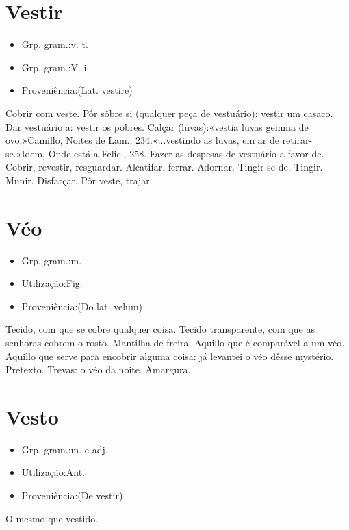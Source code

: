 \documentclass{article}
\begin{document}
\section{Vestir}
\begin{itemize}
\item {Grp. gram.:v. t.}
\end{itemize}
\begin{itemize}
\item {Grp. gram.:V. i.}
\end{itemize}
\begin{itemize}
\item {Proveniência:(Lat. \textunderscore vestire\textunderscore )}
\end{itemize}
Cobrir com veste.
Pôr sôbre si (qualquer peça de vestuário): \textunderscore vestir um casaco\textunderscore .
Dar vestuário a: \textunderscore vestir os pobres\textunderscore .
Calçar (luvas):«\textunderscore vestia luvas gemma de ovo.\textunderscore »Camillo, \textunderscore Noites de Lam.\textunderscore , 234.«\textunderscore ...vestindo as luvas, em ar de retirar-se.\textunderscore »\textunderscore Idem\textunderscore , \textunderscore Onde está a Felic.\textunderscore , 258.
Fazer as despesas de vestuário a favor de.
Cobrir, revestir, resguardar.
Alcatifar, ferrar.
Adornar.
Tingir-se de.
Tingir.
Munir.
Disfarçar.
Pôr veste, trajar.
\section{Véo}
\begin{itemize}
\item {Grp. gram.:m.}
\end{itemize}
\begin{itemize}
\item {Utilização:Fig.}
\end{itemize}
\begin{itemize}
\item {Proveniência:(Do lat. \textunderscore velum\textunderscore )}
\end{itemize}
Tecido, com que se cobre qualquer coisa.
Tecido transparente, com que as senhoras cobrem o rosto.
Mantilha de freira.
Aquillo que é comparável a um véo.
Aquillo que serve para encobrir alguma coisa: \textunderscore já levantei o véo dêsse mystério\textunderscore .
Pretexto.
Trevas: \textunderscore o véo da noite\textunderscore .
Amargura.
\section{Vesto}
\begin{itemize}
\item {Grp. gram.:m.  e  adj.}
\end{itemize}
\begin{itemize}
\item {Utilização:Ant.}
\end{itemize}
\begin{itemize}
\item {Proveniência:(De \textunderscore vestir\textunderscore )}
\end{itemize}
O mesmo que \textunderscore vestido\textunderscore .
\end{document}
